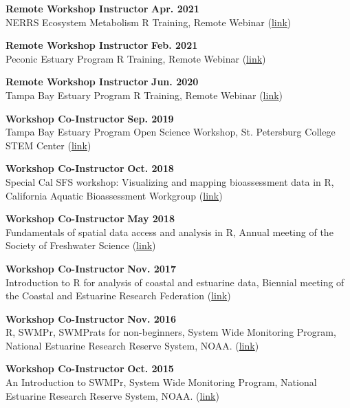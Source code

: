 \documentclass[letterpaper,12pt]{article}
\begin{document}
{\bf Remote Workshop Instructor} \hfill {\bf Apr. 2021}\\
NERRS Ecosystem Metabolism R Training, Remote Webinar ({\footnotesize\href{https://tbep-tech.github.io/ecometab-r-training/}{link}})

{\bf Remote Workshop Instructor} \hfill {\bf Feb. 2021}\\
Peconic Estuary Program R Training, Remote Webinar ({\footnotesize\href{https://tbep-tech.github.io/pep-r-training/}{link}})

{\bf Remote Workshop Instructor} \hfill {\bf Jun. 2020}\\
Tampa Bay Estuary Program R Training, Remote Webinar ({\footnotesize\href{https://tbep-tech.github.io/tbep-r-training/}{link}})

{\bf Workshop Co-Instructor} \hfill {\bf Sep. 2019}\\
Tampa Bay Estuary Program Open Science Workshop, St. Petersburg College STEM Center ({\footnotesize\href{https://tbep-tech.github.io/}{link}})

{\bf Workshop Co-Instructor} \hfill {\bf Oct. 2018}\\
Special Cal SFS workshop: Visualizing and mapping bioassessment data in R, California Aquatic Bioassessment Workgroup ({\footnotesize\href{https://sccwrp.github.io/CABW2018_R_training}{link}})

{\bf Workshop Co-Instructor} \hfill {\bf May 2018}\\
Fundamentals of spatial data access and analysis in R, Annual meeting of the Society of Freshwater Science ({\footnotesize\href{https://ryan-hill.github.io/sfs-r-gis-2018/}{link}})

{\bf Workshop Co-Instructor} \hfill {\bf Nov. 2017}\\
Introduction to R for analysis of coastal and estuarine data, Biennial meeting of the Coastal and Estuarine Research Federation ({\footnotesize\href{https://usepa.github.io/cerf_r/}{link}})

{\bf Workshop Co-Instructor} \hfill {\bf Nov. 2016}\\
R, SWMPr, SWMPrats for non-beginners, System Wide Monitoring Program, National Estuarine Research Reserve System, NOAA. ({\footnotesize\href{http://swmprats.net/2016-workshop}{link}})

{\bf Workshop Co-Instructor} \hfill {\bf Oct. 2015}\\
An Introduction to SWMPr, System Wide Monitoring Program, National Estuarine Research Reserve System, NOAA. ({\footnotesize\href{http://swmprats.net/workshop-2015}{link}})
\end{document}
